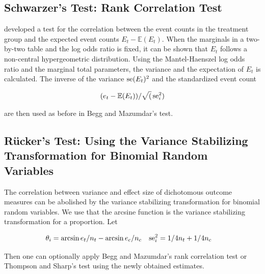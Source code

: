 \documentclass[11pt,a4paper,twoside]{book}\usepackage[]{graphicx}\usepackage[]{color}
\begin{document}
\subsection{Schwarzer's Test: Rank Correlation Test} \label{sec:Schwarzer}
\citet{Schwarzer} developed a test for the correlation between the event counts in the treatment group and the expected event counts $E_t - \mathbb{E}(E_t)$. When the marginals in a two-by-two table and the log odds ratio is fixed, it can be shown that $E_t$ follows a non-central hypergeometric distribution. Using the Mantel-Haenszel log odds ratio and the marginal total parameters, the variance and the expectation of $E_t$ is calculated. The inverse of the variance $\operatorname{se}(E_t)^2$ and the standardized event count

\begin{align}
(e_t - \mathbb{E}(E_t))/\sqrt(\operatorname{se}_i^2)
\end{align}

are then used as before in Begg and Mazumdar's test.

\subsection{R\"ucker's Test: Using the Variance Stabilizing Transformation for Binomial Random Variables} \label{sec:Rucker}
The correlation between variance and effect size of dichotomous outcome measures can be abolished by the variance stabilizing transformation for binomial random variables. We use that the arcsine function is the variance stabilizing transformation for a proportion. Let

\begin{align}
\theta_i &= \arcsin{e_t/n_t} - \arcsin{e_c/n_c} \nonumber &
\operatorname{se}_i^2 &= 1/4n_t + 1/4n_c \nonumber
\end{align}

Then one can optionally apply Begg and Mazumdar's rank correlation test or Thompson and Sharp's test using the newly obtained estimates.
\end{document}
